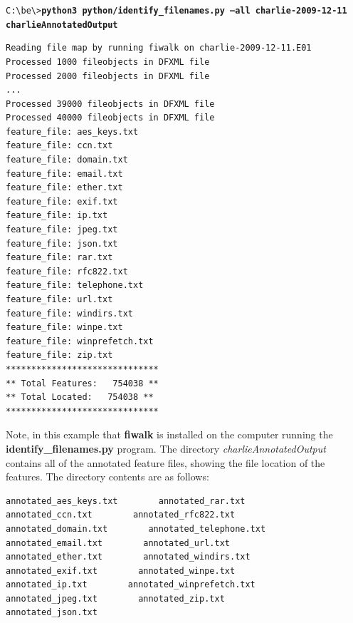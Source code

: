 \begingroup
\footnotesize
\texttt{C:\textbackslash be\textbackslash \textgreater \textbf{python3 python/identify\_filenames.py --all charlie-2009-12-11 charlieAnnotatedOutput}}
\endgroup
\begingroup
\footnotesize
\begin{Verbatim}[fontfamily=courier, commandchars=\\\{\}]
Reading file map by running fiwalk on charlie-2009-12-11.E01
Processed 1000 fileobjects in DFXML file
Processed 2000 fileobjects in DFXML file
...
Processed 39000 fileobjects in DFXML file
Processed 40000 fileobjects in DFXML file
feature_file: aes_keys.txt
feature_file: ccn.txt
feature_file: domain.txt
feature_file: email.txt
feature_file: ether.txt
feature_file: exif.txt
feature_file: ip.txt
feature_file: jpeg.txt
feature_file: json.txt
feature_file: rar.txt
feature_file: rfc822.txt
feature_file: telephone.txt
feature_file: url.txt
feature_file: windirs.txt
feature_file: winpe.txt
feature_file: winprefetch.txt
feature_file: zip.txt
******************************
** Total Features:   754038 **
** Total Located:   754038 **
******************************
\end{Verbatim}
\endgroup

Note, in this example that \textbf{fiwalk} is installed on the computer running the \textbf{identify\_filenames.py} program. The directory \textit{charlieAnnotatedOutput} contains all of the annotated feature files, showing the file location of the features. The directory contents are as follows:

\begingroup
\footnotesize
\begin{Verbatim}
annotated_aes_keys.txt        annotated_rar.txt
annotated_ccn.txt        annotated_rfc822.txt
annotated_domain.txt        annotated_telephone.txt
annotated_email.txt        annotated_url.txt
annotated_ether.txt        annotated_windirs.txt
annotated_exif.txt        annotated_winpe.txt
annotated_ip.txt        annotated_winprefetch.txt
annotated_jpeg.txt        annotated_zip.txt
annotated_json.txt
\end{Verbatim}
\endgroup

